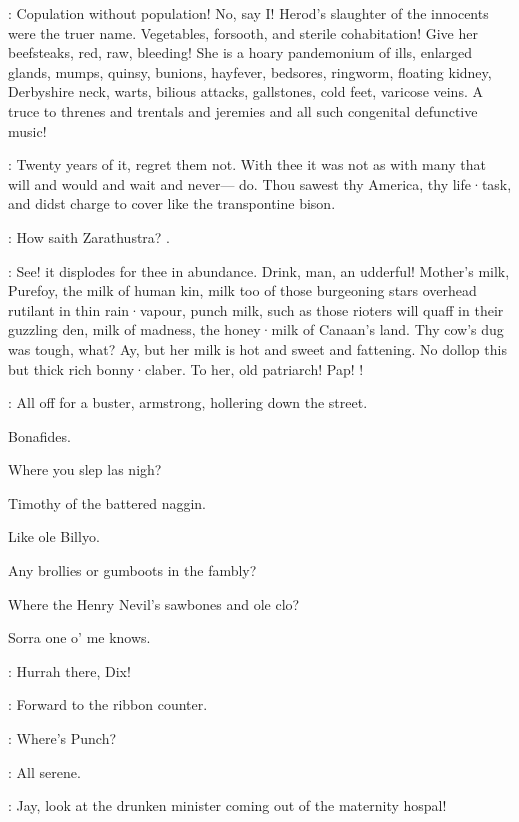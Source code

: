 :
Copulation without population!
No,
say I!
Herod's slaughter of the
innocents were the truer name.
Vegetables,
forsooth,
and sterile
cohabitation!
Give her beefsteaks,
red,
raw,
bleeding!
She is a hoary
pandemonium of ills,
enlarged glands,
mumps,
quinsy,
bunions,
hayfever,
bedsores,
ringworm,
floating kidney,
Derbyshire neck,
warts,
bilious
attacks,
gallstones,
cold feet,
varicose veins.
A truce to threnes and
trentals and jeremies and all such congenital defunctive music!

:
Twenty years of it,
regret them not.
With thee it was not as with
many that will and would and wait and never---%
do.
Thou sawest thy America,
thy life·task,
and didst charge to cover like the transpontine bison.

:
How saith Zarathustra?
.

:
See!
it displodes for thee in abundance.
Drink,
man,
an
udderful!
Mother's milk,
Purefoy,
the milk of human kin,
milk too of
those burgeoning stars overhead rutilant in thin rain·vapour,
punch milk,
such as those rioters will quaff in their guzzling den,
milk of madness,
the honey·milk of Canaan's land.
Thy cow's dug was tough,
what?
Ay,
but her milk is hot and sweet and fattening.
No dollop this but thick rich bonny·claber.
To her,
old patriarch!
Pap!
!



:
All off for a buster,
armstrong,
hollering down the street.

Bonafides.

Where you slep las nigh?

Timothy of the battered naggin.

Like ole Billyo.

Any brollies or gumboots in the fambly?

Where the Henry Nevil's sawbones and ole clo?

Sorra one o' me knows.

\madden:
Hurrah there,
Dix!

:
Forward to the ribbon counter.

\dixon:
Where's Punch?

:
All serene.

\bystander:
Jay,
look at the drunken minister coming out of the maternity hospal!

